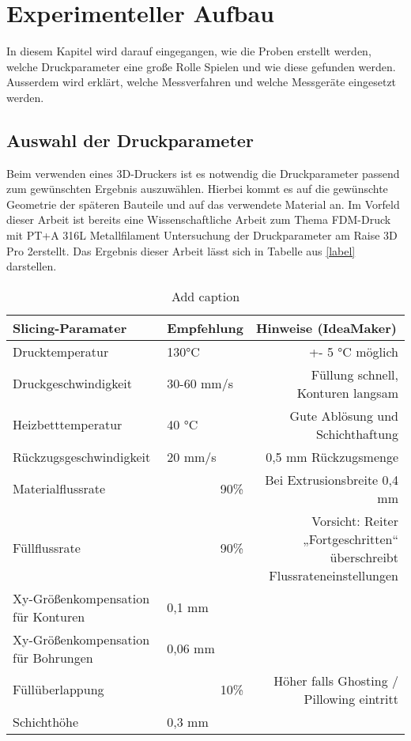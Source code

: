 \chapter{Experimenteller Aufbau}

In diesem Kapitel wird darauf eingegangen, wie die Proben erstellt werden, welche Druckparameter eine große Rolle Spielen und wie diese gefunden werden. Ausserdem wird erklärt, welche Messverfahren und welche Messgeräte eingesetzt werden.\\


\section{Auswahl der Druckparameter}

Beim verwenden eines 3D-Druckers ist es notwendig die Druckparameter passend zum gewünschten Ergebnis auszuwählen. Hierbei kommt es auf die gewünschte Geometrie der späteren Bauteile und auf das verwendete Material an. Im Vorfeld dieser Arbeit ist bereits eine Wissenschaftliche Arbeit zum Thema \glqq FDM-Druck mit PT+A 316L Metallfilament Untersuchung der Druckparameter am Raise 3D Pro 2\grqq erstellt. Das Ergebnis dieser Arbeit lässt sich in Tabelle aus \autoref{label} darstellen.

\begin{table}[htbp]
    \centering
    \caption{Add caption}
      \begin{tabular}{|l|l|r|}
      \toprule
      \textbf{Slicing-Paramater} & \textbf{Empfehlung} & \multicolumn{1}{l|}{\textbf{Hinweise (IdeaMaker)}} \\
      \midrule
      Drucktemperatur & 130°C & \multicolumn{1}{p{12.555em}|}{+- 5 °C möglich} \\
      \midrule
      Druckgeschwindigkeit & 30-60 mm/s & \multicolumn{1}{p{12.555em}|}{Füllung schnell, Konturen langsam} \\
      \midrule
      Heizbetttemperatur & 40 °C & \multicolumn{1}{p{12.555em}|}{Gute Ablösung und Schichthaftung} \\
      \midrule
      Rückzugsgeschwindigkeit & 20 mm/s & \multicolumn{1}{p{12.555em}|}{0,5 mm Rückzugsmenge} \\
      \midrule
      Materialflussrate & \multicolumn{1}{r|}{90\%} & \multicolumn{1}{p{12.555em}|}{Bei Extrusionsbreite 0,4 mm} \\
      \midrule
      Füllflussrate & \multicolumn{1}{r|}{90\%} & \multicolumn{1}{p{12.555em}|}{Vorsicht: Reiter „Fortgeschritten“ überschreibt Flussrateneinstellungen} \\
      \midrule
      Xy-Größenkompensation für Konturen & 0,1 mm &  \\
      \midrule
      Xy-Größenkompensation für Bohrungen & 0,06 mm &  \\
      \midrule
      Füllüberlappung & \multicolumn{1}{r|}{10\%} & \multicolumn{1}{p{12.555em}|}{Höher falls Ghosting / Pillowing eintritt} \\
      \midrule
      Schichthöhe & 0,3 mm &  \\
      \bottomrule
      \end{tabular}%
    \label{tab:addlabel}%
  \end{table}%
  

